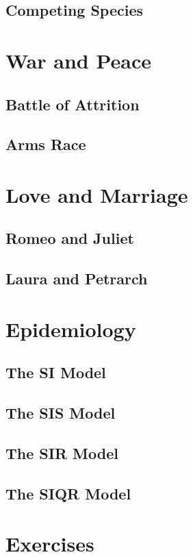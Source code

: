 \documentclass{book}
\begin{document}
\subsection{Competing Species}
\section{War and Peace}
\subsection{Battle of Attrition}
\subsection{Arms Race}
\section{Love and Marriage}
\subsection{Romeo and Juliet}
\subsection{Laura and Petrarch}
\section{Epidemiology}
\subsection{The SI Model}
\subsection{The SIS Model}
\subsection{The SIR Model}
\subsection{The SIQR Model}
\section{Exercises}
\end{document}
